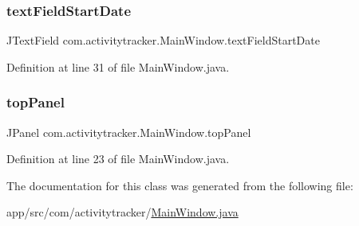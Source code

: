 \subsubsection{\texorpdfstring{text\+Field\+Start\+Date}{textFieldStartDate}}
{\footnotesize\ttfamily J\+Text\+Field com.\+activitytracker.\+Main\+Window.\+text\+Field\+Start\+Date\hspace{0.3cm}{\ttfamily [private]}}



Definition at line 31 of file Main\+Window.\+java.

\mbox{\label{classcom_1_1activitytracker_1_1_main_window_a6baf76b2b8ede1ba82fc6d096ddb580b}} 
\subsubsection{\texorpdfstring{top\+Panel}{topPanel}}
{\footnotesize\ttfamily J\+Panel com.\+activitytracker.\+Main\+Window.\+top\+Panel\hspace{0.3cm}{\ttfamily [private]}}



Definition at line 23 of file Main\+Window.\+java.



The documentation for this class was generated from the following file\+:\begin{DoxyCompactItemize}
\item 
app/src/com/activitytracker/\mbox{\hyperlink{_main_window_8java}{Main\+Window.\+java}}\end{DoxyCompactItemize}
